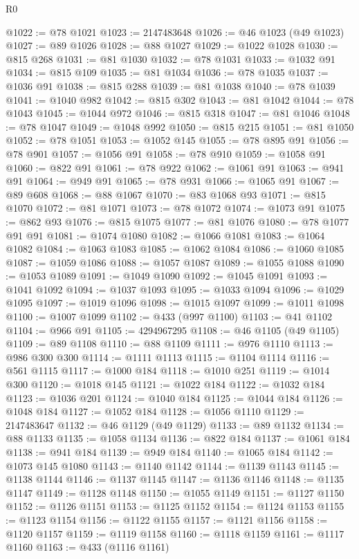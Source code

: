 \begin{lexlean}{R0}
\begin{coremodule}
@1022 := @78 @1021
@1023 := 2147483648
@1026 := @46 @1023 (@49 @1023)
@1027 := @89 @1026
@1028 := @88 @1027
@1029 := @1022 @1028
@1030 := @815 @268
@1031 := @81 @1030
@1032 := @78 @1031
@1033 := @1032 @91
@1034 := @815 @109
@1035 := @81 @1034
@1036 := @78 @1035
@1037 := @1036 @91
@1038 := @815 @288
@1039 := @81 @1038
@1040 := @78 @1039
@1041 := @1040 @982
@1042 := @815 @302
@1043 := @81 @1042
@1044 := @78 @1043
@1045 := @1044 @972
@1046 := @815 @318
@1047 := @81 @1046
@1048 := @78 @1047
@1049 := @1048 @992
@1050 := @815 @215
@1051 := @81 @1050
@1052 := @78 @1051
@1053 := @1052 @145
@1055 := @78 @895 @91
@1056 := @78 @901
@1057 := @1056 @91
@1058 := @78 @910
@1059 := @1058 @91
@1060 := @822 @91
@1061 := @78 @922
@1062 := @1061 @91
@1063 := @941 @91
@1064 := @949 @91
@1065 := @78 @931
@1066 := @1065 @91
@1067 := @89 @608
@1068 := @88 @1067
@1070 := @83 @1068 @93
@1071 := @815 @1070
@1072 := @81 @1071
@1073 := @78 @1072
@1074 := @1073 @91
@1075 := @862 @93
@1076 := @815 @1075
@1077 := @81 @1076
@1080 := @78 @1077 @91 @91
@1081 := @1074 @1080
@1082 := @1066 @1081
@1083 := @1064 @1082
@1084 := @1063 @1083
@1085 := @1062 @1084
@1086 := @1060 @1085
@1087 := @1059 @1086
@1088 := @1057 @1087
@1089 := @1055 @1088
@1090 := @1053 @1089
@1091 := @1049 @1090
@1092 := @1045 @1091
@1093 := @1041 @1092
@1094 := @1037 @1093
@1095 := @1033 @1094
@1096 := @1029 @1095
@1097 := @1019 @1096
@1098 := @1015 @1097
@1099 := @1011 @1098
@1100 := @1007 @1099
@1102 := @433 (@997 @1100)
@1103 := @41 @1102
@1104 := @966 @91
@1105 := 4294967295
@1108 := @46 @1105 (@49 @1105)
@1109 := @89 @1108
@1110 := @88 @1109
@1111 := @976 @1110
@1113 := @986 @300 @300
@1114 := @1111 @1113
@1115 := @1104 @1114
@1116 := @561 @1115
@1117 := @1000 @184
@1118 := @1010 @251
@1119 := @1014 @300
@1120 := @1018 @145
@1121 := @1022 @184
@1122 := @1032 @184
@1123 := @1036 @201
@1124 := @1040 @184
@1125 := @1044 @184
@1126 := @1048 @184
@1127 := @1052 @184
@1128 := @1056 @1110
@1129 := 2147483647
@1132 := @46 @1129 (@49 @1129)
@1133 := @89 @1132
@1134 := @88 @1133
@1135 := @1058 @1134
@1136 := @822 @184
@1137 := @1061 @184
@1138 := @941 @184
@1139 := @949 @184
@1140 := @1065 @184
@1142 := @1073 @145 @1080
@1143 := @1140 @1142
@1144 := @1139 @1143
@1145 := @1138 @1144
@1146 := @1137 @1145
@1147 := @1136 @1146
@1148 := @1135 @1147
@1149 := @1128 @1148
@1150 := @1055 @1149
@1151 := @1127 @1150
@1152 := @1126 @1151
@1153 := @1125 @1152
@1154 := @1124 @1153
@1155 := @1123 @1154
@1156 := @1122 @1155
@1157 := @1121 @1156
@1158 := @1120 @1157
@1159 := @1119 @1158
@1160 := @1118 @1159
@1161 := @1117 @1160
@1163 := @433 (@1116 @1161)

\end{coremodule}
\end{lexlean}
